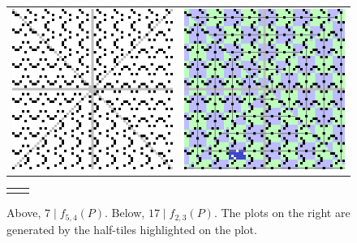 \documentclass{article}
\begin{document}
\begin{figure}[h!]
	\centering
	\begin{tabular}{cc}
	\includegraphics[scale=0.7]{m5_n4_p7_d} & \includegraphics[scale=0.7]{m5_n4_p7_s}
	\end{tabular}
	\caption{Above, \(7 \mid f_{5,4}(P)\). Below, \(17 \mid f_{2,3}(P)\). The plots on the right are generated by the half-tiles highlighted on the plot.}
	\begin{tabular}{cc}
	& \\

\end{tabular}
\end{figure}
\end{document}
